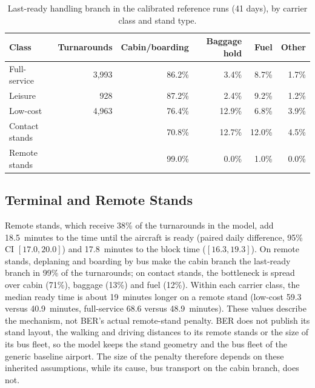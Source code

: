 \begin{table}[htbp]\centering\small
\begin{tabular}{lrrrrr}\hline
Class & Turnarounds & Cabin/boarding & Baggage hold & Fuel & Other\\\hline
Full-service & 3,993 & 86.2\% & 3.4\% & 8.7\% & 1.7\%\\
Leisure & 928 & 87.2\% & 2.4\% & 9.2\% & 1.2\%\\
Low-cost & 4,963 & 76.4\% & 12.9\% & 6.8\% & 3.9\%\\\hline
Contact stands & & 70.8\% & 12.7\% & 12.0\% & 4.5\%\\
Remote stands & & 99.0\% & 0.0\% & 1.0\% & 0.0\%\\\hline
\end{tabular}
\caption{Last-ready handling branch in the calibrated reference runs (41 days), by carrier class and stand type.}
\label{tab:mechanism}
\end{table}

\subsection{Terminal and Remote Stands}
Remote stands, which receive 38\% of the turnarounds in the model, add 18.5~minutes to the time until the aircraft is ready (paired daily difference, 95\% CI $[17.0,20.0]$) and 17.8~minutes to the block time ($[16.3,19.3]$). On remote stands, deplaning and boarding by bus make the cabin branch the last-ready branch in 99\% of the turnarounds; on contact stands, the bottleneck is spread over cabin (71\%), baggage (13\%) and fuel (12\%). Within each carrier class, the median ready time is about 19~minutes longer on a remote stand (low-cost 59.3 versus 40.9~minutes, full-service 68.6 versus 48.9~minutes). These values describe the mechanism, not BER's actual remote-stand penalty. BER does not publish its stand layout, the walking and driving distances to its remote stands or the size of its bus fleet, so the model keeps the stand geometry and the bus fleet of the generic baseline airport. The size of the penalty therefore depends on these inherited assumptions, while its cause, bus transport on the cabin branch, does not.

